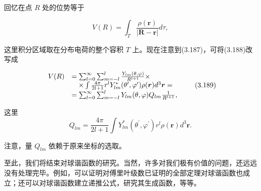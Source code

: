 回忆在点 $R$ 处的位势等于

\begin{equation*}
V (R) = \int_ {T} \frac {\rho (\boldsymbol {r})}{| \boldsymbol {R} - \boldsymbol {r} |} d \tau ,\tag{3.188}
\end{equation*}

这里积分区域取在分布电荷的整个容积 $T$ 上。现在注意到(3.187)，可将(3.188)改写成

\begin{equation*}
\begin{array}{r l} V (R) & = \sum_ {l = 0} ^ {\infty} \sum_ {m = - l} ^ {l} \frac {Y _ {l m} (\theta , \varphi)}{R ^ {l + 1}} \times \\ & \quad \times \int \frac {4 \pi}{2 l + 1} r ^ {l} Y _ {l m} ^ {*} (\theta^ {\prime}, \varphi^ {\prime}) \rho (\boldsymbol {r}) d ^ {3} \boldsymbol {r} = \\ & = \sum_ {l = 0} ^ {\infty} \sum_ {m = - l} ^ {l} Y _ {l m} (\theta , \varphi) Q _ {l m} \frac {1}{R ^ {l + 1}}, \end{array} \tag{3.189}
\end{equation*}

这里
\begin{equation*}
Q _ {l m} = \frac {4 \pi}{2 l + 1} \int Y _ {l m} ^ {*} (\theta^ {\prime}, \varphi^ {\prime}) r ^ {l} \rho (\boldsymbol {r}) d ^ {3} \boldsymbol {r}.\tag{3.190}
\end{equation*}

注意，量 $Q_{lm}$ 依赖于原来坐标的选取。

至此，我们将结束对球谐函数的研究。当然，许多对我们极有价值的问题，还远远没有处理完毕。例如，可以证明对傅里叶级数已证明的全部定理对球谐函数也成立；还可以对球谐函数建立递推公式，研究其生成函数，等等。
